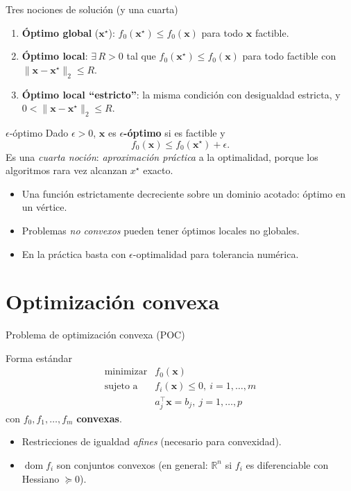 \documentclass[10pt,aspectratio=169]{beamer}
\newcommand{\R}{\mathbb{R}}
\newcommand{\x}{\mathbf{x}}
\newcommand{\0}{\mathbf{0}}
\newcommand{\dom}{\operatorname{dom}}
\begin{document}
\begin{frame}{Tres nociones de solución (y una cuarta)}
  \begin{enumerate}
    \item \textbf{Óptimo global} ($\x^\star$):
      $f_0(\x^\star)\le f_0(\x)$ para todo $\x$ factible.
    \item \textbf{Óptimo local}:
      $\exists\,R>0$ tal que $f_0(\x^\star)\le f_0(\x)$ para todo
      factible con $\|\x-\x^\star\|_2\le R$.
    \item \textbf{Óptimo local ``estricto''}:
      la misma condición con desigualdad estricta, y
      $0<\|\x-\x^\star\|_2\le R$.
  \end{enumerate}
  \vspace{0.4em}
  \begin{block}{$\epsilon$-\'optimo}
    Dado $\epsilon>0$, $\x$ es \textbf{$\epsilon$-\'optimo} si es factible y
    \[
      f_0(\x)\le f_0(\x^\star)+\epsilon.
    \]
    Es una \emph{cuarta noción}: \emph{aproximación práctica} a la
    optimalidad, porque los algoritmos rara vez alcanzan $x^\star$ exacto.
  \end{block}
  \begin{itemize}
    \item Una función estrictamente decreciente sobre un dominio acotado:
      óptimo en un vértice.
    \item Problemas \emph{no convexos} pueden tener óptimos locales no
      globales.
    \item En la práctica basta con $\epsilon$-optimalidad para
      tolerancia numérica.
  \end{itemize}
\end{frame}

\section{Optimización convexa}
\begin{frame}{Problema de optimización convexa (POC)}
  \begin{block}{Forma estándar}
    \[
      \begin{array}{ll}
        \text{minimizar} & f_0(\x) \\
        \text{sujeto a}  & f_i(\x)\le 0,\ i=1,\dots,m\\
                         & a_j^\top\x=b_j,\ j=1,\dots,p
      \end{array}
    \]
    con $f_0,f_1,\dots,f_m$ \textbf{convexas}.
  \end{block}
  \begin{itemize}
    \item Restricciones de igualdad \emph{afines} (necesario para convexidad).
    \item $\dom f_i$ son conjuntos convexos (en general: $\R^n$ si $f_i$
      es diferenciable con Hessiano $\succeq 0$).
  \end{itemize}
\end{frame}
\end{document}
